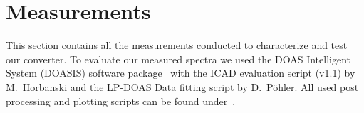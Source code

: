 \section{Measurements}
\label{sec:measurements}

This section contains all the measurements conducted to characterize
and test our converter. To evaluate our measured spectra we used the
DOAS Intelligent System (DOASIS) software package~\cite{doasis} with
the ICAD evaluation script (v1.1) by M.\ Horbanski and the LP-DOAS
Data fitting script by D.\ Pöhler. All used post processing and
plotting scripts can be found under~\cite{scripts}.

